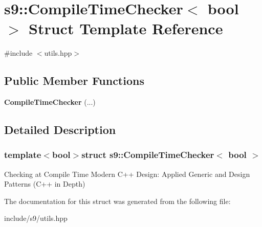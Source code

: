 \hypertarget{structs9_1_1CompileTimeChecker}{\section{s9\-:\-:\-Compile\-Time\-Checker$<$ bool $>$ \-Struct \-Template \-Reference}
\label{structs9_1_1CompileTimeChecker}
}


{\ttfamily \#include $<$utils.\-hpp$>$}

\subsection*{\-Public \-Member \-Functions}
\begin{DoxyCompactItemize}
\item 
\hypertarget{structs9_1_1CompileTimeChecker_a53515adf153a125605e1df2e41f31e6d}{{\bfseries \-Compile\-Time\-Checker} (...)}\label{structs9_1_1CompileTimeChecker_a53515adf153a125605e1df2e41f31e6d}

\end{DoxyCompactItemize}


\subsection{\-Detailed \-Description}
\subsubsection*{template$<$bool$>$struct s9\-::\-Compile\-Time\-Checker$<$ bool $>$}

\-Checking at \-Compile \-Time \-Modern \-C++ \-Design\-: \-Applied \-Generic and \-Design \-Patterns (\-C++ in \-Depth) 

\-The documentation for this struct was generated from the following file\-:\begin{DoxyCompactItemize}
\item 
include/s9/utils.\-hpp\end{DoxyCompactItemize}
